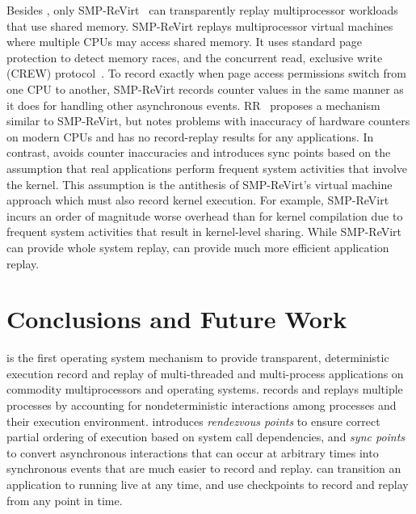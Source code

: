 Besides \scribe{}, only SMP-ReVirt~\cite{smp-revirt} can transparently
replay multiprocessor workloads that use shared memory.
SMP-ReVirt replays multiprocessor virtual machines where multiple CPUs
may access shared memory.  It uses standard page protection to detect
memory races, and the concurrent read, exclusive write (CREW)
protocol~\cite{crew,instant-replay}.  To record exactly when page
access permissions switch from one CPU to another, SMP-ReVirt records
counter values in the same manner as it does for handling other
asynchronous events.  RR~\cite{rr} proposes a mechanism similar to
SMP-ReVirt, but notes problems with inaccuracy of hardware counters on
modern CPUs and has no record-replay results for any applications.
In contrast, \scribe{} avoids counter inaccuracies and introduces sync
points based on the 
assumption that real
applications perform frequent system activities that involve the
kernel.  This assumption is the antithesis of SMP-ReVirt's virtual
machine approach which must also record kernel execution.
For example, SMP-ReVirt incurs an order of magnitude worse
overhead than \scribe{} for kernel compilation due to frequent system
activities that result in kernel-level sharing.  While SMP-ReVirt can
provide whole system replay, \scribe{} can provide much more efficient
application replay.   

\section{Conclusions and Future Work}
\label{scribe:sec:conclude}

\scribe{} is the first operating system mechanism to provide transparent,
deterministic execution record and replay of multi-threaded and
multi-process applications on commodity multiprocessors and operating
systems.  \scribe{} records and replays multiple processes by
accounting for nondeterministic interactions among
processes and their execution environment.  \scribe{} introduces {\em
rendezvous points} to ensure correct partial ordering of execution
based on system call dependencies, and {\em sync points} to convert
asynchronous interactions that can occur at arbitrary times into
synchronous events that are much easier to record and replay.  
\scribe{} can transition an application  to running live at any time,
and use checkpoints to record and replay from any point in
time.

